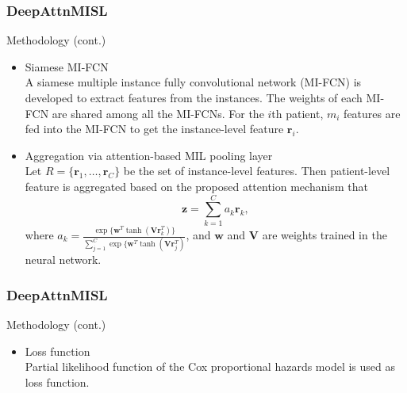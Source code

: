 \documentclass{beamer}
\begin{document}
	\begin{frame}
		\frametitle{DeepAttnMISL}
		Methodology (cont.)
		
		\begin{itemize}
			\item Siamese MI-FCN \\
			A siamese multiple instance fully convolutional network (MI-FCN) is developed to extract features from the instances. The weights of each MI-FCN are shared among all the MI-FCNs. For the $i$th patient, $m_i$ features are fed into the MI-FCN to get the instance-level feature $\mathbf{ r }_i$.
			\item Aggregation via attention-based MIL pooling layer \\
			Let $R = \{ \mathbf{ r }_1, \dots, \mathbf{ r }_C \}$ be the set of instance-level features. Then patient-level feature is aggregated based on the proposed attention mechanism that 
			\[
			\mathbf{ z } = \sum_{ k = 1 }^{ C } a_k \mathbf{ r }_k,
			\] 
			where $a_k = \frac{ \exp \{ \mathbf{ w }^T \tanh( \mathbf{ V }\mathbf{ r }_k^T ) \}}{ \sum_{ j = 1 }^{ C }\exp \{ \mathbf{ w }^T \tanh( \mathbf{ V }\mathbf{ r }_j^T ) }$, and $\mathbf{ w }$ and $\mathbf{V}$ are weights trained in the neural network.
		\end{itemize}
	\end{frame}
	
	\begin{frame}
		\frametitle{DeepAttnMISL}
		Methodology (cont.)
		
		\begin{itemize}
			\item Loss function \\
			\vspace{5mm}
			Partial likelihood function of the Cox proportional hazards model is used as loss function.
		\end{itemize}
	\end{frame}
	
\end{document}
